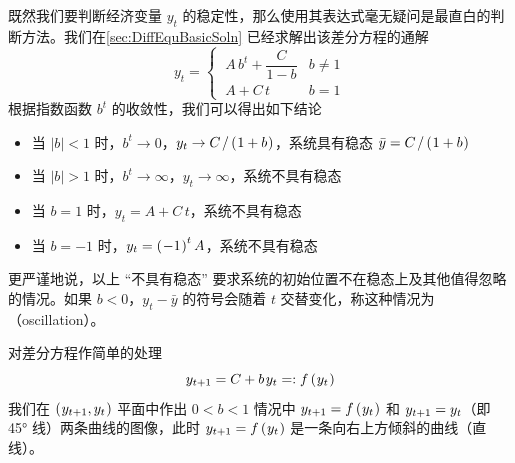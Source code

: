 
既然我们要判断经济变量 \(y_t\) 的稳定性，那么使用其表达式毫无疑问是最直白的判断方法。我们在\ref{sec:DiffEquBasicSoln} 已经求解出该差分方程的通解
\begin{equation}
    y_t=\begin{cases}
        \ A\,b^{t}+\dfrac C{1-b} & b\neq 1\\
        \ A+C\,t & b=1
    \end{cases}
\end{equation}
根据指数函数 \(b^t\) 的收敛性，我们可以得出如下结论
\begin{itemize}
    \item 当 \(|b|<1\) 时，\(b^t\to 0\)，\(y_t\to C\,/\bka
    {1+b}\)，系统具有稳态 \(\bar y = C\,/\bka
    {1+b}\)
    \item 当 \(|b|>1\) 时，\(b^t\to \infty\)，\(y_t\to \infty\)，系统不具有稳态
    \item 当 \(b=1\) 时，\(y_t=A+C\,t\)，系统不具有稳态
    \item 当 \(b=-1\) 时，\(y_t=\left(\mspace{1mu}-1
    \mspace{1mu}\right)^tA\)，系统不具有稳态
\end{itemize}
更严谨地说，以上 “不具有稳态” 要求系统的初始位置不在稳态上及其他值得忽略的情况。如果 \(b<0\)，\(y_t-\bar y\) 的符号会随着 \(t\) 交替变化，称这种情况为\,（oscillation）。


对差分方程作简单的处理
\begin{equation}
    y\nt = C + b\,y_t =: f\bka{y_t}
\end{equation}
我们在 \(\left(\mspace{1mu} y_{t+1},y_t\mspace{1mu}\right)\) 平面中作出 \(0<b<1\) 情况中 \(y_{t+1}=f\left(\mspace{1mu} y_t\mspace{1mu}\right)\) 和 \(y_{t+1}=y_t\)（即 45° 线）两条曲线的图像，此时 \(y_{t+1}=f\left(\mspace{1mu} y_t\mspace{1mu}\right)\) 是一条向右上方倾斜的曲线（直线）。

